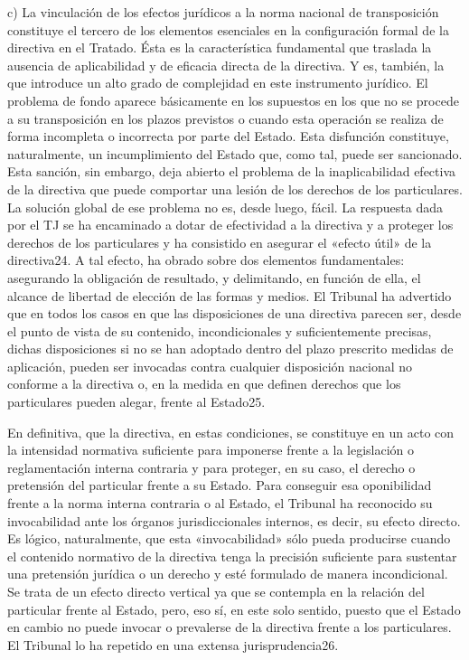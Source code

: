 \documentclass[10pt,a4paper]{article}
\begin{document}
c) La vinculación de los efectos jurídicos a la norma nacional de transposición constituye el tercero de los elementos esenciales en la configuración formal de la directiva en el Tratado. Ésta es la característica fundamental que traslada la ausencia de aplicabilidad y de eficacia directa de la directiva. Y es, también, la que introduce un alto grado de complejidad en este instrumento jurídico. El problema de fondo aparece básicamente en los supuestos en los que no se procede a su transposición en los plazos previstos o cuando esta operación se realiza de forma incompleta o incorrecta por parte del Estado. Esta disfunción constituye, naturalmente, un incumplimiento del Estado que, como tal, puede ser sancionado. Esta sanción, sin embargo, deja abierto el problema de la inaplicabilidad efectiva de la directiva que puede comportar una lesión de los derechos de los particulares. La solución global de ese problema no es, desde luego, fácil. La respuesta dada por el TJ se ha encaminado a dotar de efectividad a la directiva y a proteger los derechos de los particulares y ha consistido en asegurar el «efecto útil» de la directiva24. A tal efecto, ha obrado sobre dos elementos fundamentales: asegurando la obligación de resultado, y delimitando, en función de ella, el alcance de libertad de elección de las formas y medios. El Tribunal ha advertido que en todos los casos en que las disposiciones de una directiva parecen ser, desde el punto de vista de su contenido, incondicionales y suficientemente precisas, dichas disposiciones si no se han adoptado dentro del plazo prescrito medidas de aplicación, pueden ser invocadas contra cualquier disposición nacional no conforme a la directiva o, en la medida en que definen derechos que los particulares pueden alegar, frente al Estado25.

En definitiva, que la directiva, en estas condiciones, se constituye en un acto con la intensidad normativa suficiente para imponerse frente a la legislación o reglamentación interna contraria y para proteger, en su caso, el derecho o pretensión del particular frente a su Estado. Para conseguir esa oponibilidad frente a la norma interna contraria o al Estado, el Tribunal ha reconocido su invocabilidad ante los órganos jurisdiccionales internos, es decir, su efecto directo. Es lógico, naturalmente, que esta «invocabilidad» sólo pueda producirse cuando el contenido normativo de la directiva tenga la precisión suficiente para sustentar una pretensión jurídica o un derecho y esté formulado de manera incondicional. Se trata de un efecto directo vertical ya que se contempla en la relación del particular frente al Estado, pero, eso sí, en este solo sentido, puesto que el Estado en cambio no puede invocar o prevalerse de la directiva frente a los particulares. El Tribunal lo ha repetido en una extensa jurisprudencia26.
\end{document}
